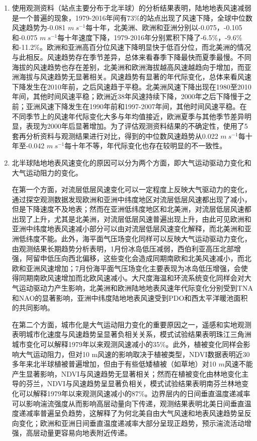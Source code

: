 \begin{enumerate}

\item 使用观测资料（站点主要分布于北半球）的分析结果表明，陆地地表风速减弱是一个普遍的现象，1979-2016年间有73\%的站点出现了风速下降，全球中位数风速趋势为-0.081 $m ~ s^{-1}$每十年，北美洲、欧洲和亚洲分别以-0.075，-0.105和-0.075 $m ~ s^{-1}$每十年速度下降，1979-2016年分别累积下降了-6.5\%，-9.6\%和-11.2\%。欧洲和亚洲高百分位风速下降明显快于低百分位，而北美洲的情况与此相反。风速趋势存在季节差异，总体来看春季下降最快而夏季最慢。不同海拔的风速趋势也存在差别，北美洲和欧洲海拔越高风速越趋向于增加，而亚洲海拔与风速趋势无显著相关。风速趋势有显著的年代际变化，总体来看风速下降发生在2010年前，之后风速趋于平稳。北美洲风速下降出现在1980至2010年间，其他时间风速平稳；欧洲近38年风速持续下降，2000年之后下降慢于之前；亚洲风速下降发生在1990年前和1997-2007年间，其他时间风速平稳。在不同季节上的风速年代际变化大多与年均值接近，欧洲夏季与其他季节差异明显，表现为2000年后显著增加。为了评估观测资料结果的不确定性，使用了5套再分析资料与观测结果进行对比，得到的中位数风速趋势从0.022 $m ~ s^{-1}$每十年至-0.042 $m ~ s^{-1}$每十年不等，年代际变化也存在较明显的不一致性。

\item 北半球陆地地表风速变化的原因可以分为两个方面，即大气运动驱动力变化和大气运动阻力的变化。

在第一个方面，对流层低层风速变化可以一定程度上反映大气驱动力的变化，通过探空观测数据发现欧洲和亚洲中纬度地区对流层低层风速都出现了减小，但是下降速度不及地表；然而在亚洲低纬度地区和北美洲，对流层低层风速都出现了上升，尤其是北美洲，对流层低层风速普遍出现上升，由此可见欧洲和亚洲中纬度地表风速减小部分可以由对流层低层风速变化解释，而北美洲和亚洲低纬度不能。此外，海平面气压场变化同样可以反映大气运动驱动力变化，由观测结果长期趋势分析表明，1月份冰岛低压减弱，西伯利亚高压北部增强，阿留申低压向西北偏移，这些变化会造成同期南欧和北美风速减小，而北欧和亚洲风速增加；7月份海平面气压场变化主要表现为冰岛低压增强，会使得同期南欧风速增加而北欧风速减小。大尺度海温和环流系统变化同样会对大气运动驱动力产生影响，北美洲和欧洲陆地地表风速年代际变化分别受到TNA和NAO的显著影响，亚洲中纬度陆地地表风速受到PDO和西太平洋暖池面积的共同影响。

在第二个方面，城市化是大气运动阻力变化的重要原因之一，遥感和实地观测表明城市化速度与风速趋势呈显著负相关关系，模式试验结果表明珠江三角洲城市变化可以解释1979年以来观测风速减小的35\%。此外，植被变化同样会影响大气运动阻力，但对10 m风速的影响取决于植被类型，NDVI数据表明近30多年来北半球植被普遍增加，但由于有些低矮植被（如草地）对10 $m$风速不能产生显著影响，NDVI与风速趋势无显著相关；然而在植被变化由林地变化主导的芬兰，NDVI与风速趋势呈显著负相关，模式试验结果表明南芬兰林地变化可以解释1979年以来观测风速减小的87\%。边界层内的日间垂直温度递减率可以影响湍流强度从而影响高层动量向下传递，观测结果表明北美日间垂直温度递减率普遍呈负趋势，这解释了为何北美自由大气风速和地表风速趋势呈反向变化；欧洲和亚洲日间垂直温度递减率大部分呈现正趋势，预示湍流活动增强，高层动量更容易向地表附近传递。


\end{enumerate}
